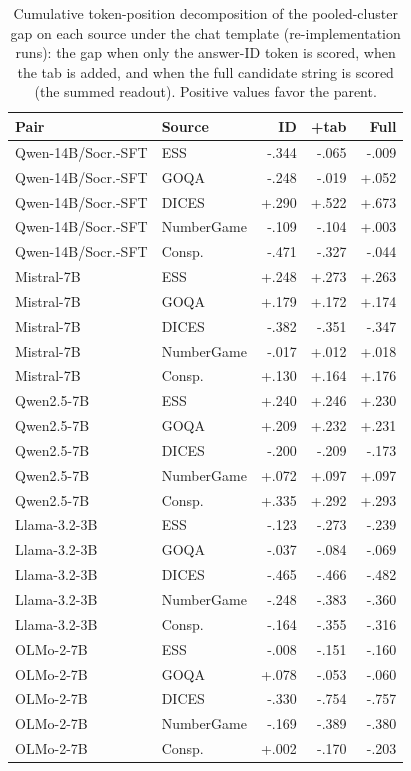 \begin{table}[t]
\centering\scriptsize
\setlength{\tabcolsep}{3pt}
\begin{tabular}{@{}llrrr@{}}
\toprule
Pair & Source & ID & +tab & Full \\
\midrule
Qwen-14B/Socr.-SFT & ESS & -.344 & -.065 & -.009 \\
Qwen-14B/Socr.-SFT & GOQA & -.248 & -.019 & +.052 \\
Qwen-14B/Socr.-SFT & DICES & +.290 & +.522 & +.673 \\
Qwen-14B/Socr.-SFT & NumberGame & -.109 & -.104 & +.003 \\
Qwen-14B/Socr.-SFT & Consp. & -.471 & -.327 & -.044 \\
Mistral-7B & ESS & +.248 & +.273 & +.263 \\
Mistral-7B & GOQA & +.179 & +.172 & +.174 \\
Mistral-7B & DICES & -.382 & -.351 & -.347 \\
Mistral-7B & NumberGame & -.017 & +.012 & +.018 \\
Mistral-7B & Consp. & +.130 & +.164 & +.176 \\
Qwen2.5-7B & ESS & +.240 & +.246 & +.230 \\
Qwen2.5-7B & GOQA & +.209 & +.232 & +.231 \\
Qwen2.5-7B & DICES & -.200 & -.209 & -.173 \\
Qwen2.5-7B & NumberGame & +.072 & +.097 & +.097 \\
Qwen2.5-7B & Consp. & +.335 & +.292 & +.293 \\
Llama-3.2-3B & ESS & -.123 & -.273 & -.239 \\
Llama-3.2-3B & GOQA & -.037 & -.084 & -.069 \\
Llama-3.2-3B & DICES & -.465 & -.466 & -.482 \\
Llama-3.2-3B & NumberGame & -.248 & -.383 & -.360 \\
Llama-3.2-3B & Consp. & -.164 & -.355 & -.316 \\
OLMo-2-7B & ESS & -.008 & -.151 & -.160 \\
OLMo-2-7B & GOQA & +.078 & -.053 & -.060 \\
OLMo-2-7B & DICES & -.330 & -.754 & -.757 \\
OLMo-2-7B & NumberGame & -.169 & -.389 & -.380 \\
OLMo-2-7B & Consp. & +.002 & -.170 & -.203 \\
\bottomrule
\end{tabular}
\caption{Cumulative token-position decomposition of the pooled-cluster gap on each source under the chat template (re-implementation runs): the gap when only the answer-ID token is scored, when the tab is added, and when the full candidate string is scored (the summed readout). Positive values favor the parent.}
\label{tab:positions-all}
\end{table}
